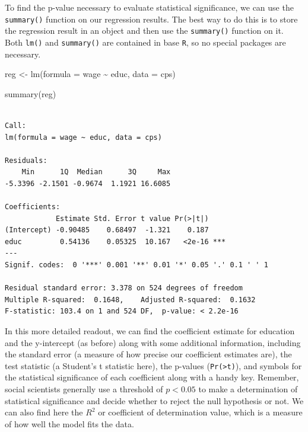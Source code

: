 \documentclass[
  letterpaper,
]{book}
\newenvironment{Shaded}{\begin{snugshade}}{\end{snugshade}}
\newcommand{\AttributeTok}[1]{\textcolor[rgb]{0.40,0.45,0.13}{#1}}
\newcommand{\FunctionTok}[1]{\textcolor[rgb]{0.28,0.35,0.67}{#1}}
\newcommand{\NormalTok}[1]{\textcolor[rgb]{0.00,0.23,0.31}{#1}}
\newcommand{\OtherTok}[1]{\textcolor[rgb]{0.00,0.23,0.31}{#1}}
\newcommand{\SpecialCharTok}[1]{\textcolor[rgb]{0.37,0.37,0.37}{#1}}
\begin{document}
To find the p-value necessary to evaluate statistical significance, we
can use the \texttt{summary()} function on our regression results. The
best way to do this is to store the regression result in an object and
then use the \texttt{summary()} function on it. Both \texttt{lm()} and
\texttt{summary()} are contained in base \texttt{R}, so no special
packages are necessary.

\begin{Shaded}
\begin{Highlighting}[]
\NormalTok{reg }\OtherTok{\textless{}{-}} \FunctionTok{lm}\NormalTok{(}\AttributeTok{formula =}\NormalTok{ wage }\SpecialCharTok{\textasciitilde{}}\NormalTok{ educ, }\AttributeTok{data =}\NormalTok{ cps)}

\FunctionTok{summary}\NormalTok{(reg)}
\end{Highlighting}
\end{Shaded}

\begin{verbatim}

Call:
lm(formula = wage ~ educ, data = cps)

Residuals:
    Min      1Q  Median      3Q     Max 
-5.3396 -2.1501 -0.9674  1.1921 16.6085 

Coefficients:
            Estimate Std. Error t value Pr(>|t|)    
(Intercept) -0.90485    0.68497  -1.321    0.187    
educ         0.54136    0.05325  10.167   <2e-16 ***
---
Signif. codes:  0 '***' 0.001 '**' 0.01 '*' 0.05 '.' 0.1 ' ' 1

Residual standard error: 3.378 on 524 degrees of freedom
Multiple R-squared:  0.1648,    Adjusted R-squared:  0.1632 
F-statistic: 103.4 on 1 and 524 DF,  p-value: < 2.2e-16
\end{verbatim}

In this more detailed readout, we can find the coefficient estimate for
education and the y-intercept (as before) along with some additional
information, including the standard error (a measure of how precise our
coefficient estimates are), the test statistic (a Student's t statistic
here), the p-values (\texttt{Pr(\textgreater{}\textbar{}t\textbar{})}),
and symbols for the statistical significance of each coefficient along
with a handy key. Remember, social scientists generally use a threshold
of \(p < 0.05\) to make a determination of statistical significance and
decide whether to reject the null hypothesis or not. We can also find
here the \(R^2\) or coefficient of determination value, which is a
measure of how well the model fits the data.
\end{document}
